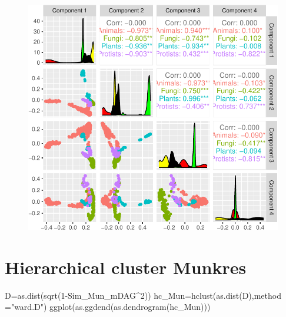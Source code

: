 \documentclass[
  letterpaper,
  DIV=11,
  numbers=noendperiod]{scrreprt}
\newenvironment{Shaded}{}{}
\newcommand{\AttributeTok}[1]{\textcolor[rgb]{0.78,0.47,0.87}{#1}}
\newcommand{\DecValTok}[1]{\textcolor[rgb]{0.82,0.60,0.40}{#1}}
\newcommand{\FunctionTok}[1]{\textcolor[rgb]{0.38,0.69,0.94}{#1}}
\newcommand{\NormalTok}[1]{\textcolor[rgb]{0.67,0.70,0.75}{#1}}
\newcommand{\OtherTok}[1]{\textcolor[rgb]{0.15,0.68,0.38}{#1}}
\newcommand{\SpecialCharTok}[1]{\textcolor[rgb]{0.34,0.71,0.76}{#1}}
\newcommand{\StringTok}[1]{\textcolor[rgb]{0.60,0.76,0.47}{#1}}
\begin{document}
\begin{figure}[H]

{\centering \includegraphics[width=1\textwidth,height=\textheight]{index_files/figure-pdf/unnamed-chunk-38-1.pdf}

}

\end{figure}

\hypertarget{hierarchical-cluster-munkres}{%
\section{Hierarchical cluster
Munkres}\label{hierarchical-cluster-munkres}}

\begin{Shaded}
\begin{Highlighting}[]
\NormalTok{D}\OtherTok{=}\FunctionTok{as.dist}\NormalTok{(}\FunctionTok{sqrt}\NormalTok{(}\DecValTok{1}\SpecialCharTok{{-}}\NormalTok{Sim\_Mun\_mDAG}\SpecialCharTok{\^{}}\DecValTok{2}\NormalTok{))}
\NormalTok{hc\_Mun}\OtherTok{=}\FunctionTok{hclust}\NormalTok{(}\FunctionTok{as.dist}\NormalTok{(D),}\AttributeTok{method =}\StringTok{"ward.D"}\NormalTok{)}
\FunctionTok{ggplot}\NormalTok{(}\FunctionTok{as.ggdend}\NormalTok{(}\FunctionTok{as.dendrogram}\NormalTok{(hc\_Mun)))}
\end{Highlighting}
\end{Shaded}
\end{document}
